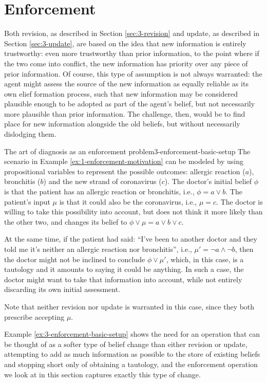 \section{Enforcement}\label{sec:3-enforcement}
Both revision, as described in Section \ref{sec:3-revision}
and update, as described in Section \ref{sec:3-update},
are based on the idea that new information is entirely
trustworthy: even more trustworthy than prior information,
to the point where if the two come into conflict, 
the new information has priority over any piece of prior information.
Of course, this type of assumption is not always warranted:
the agent might assess the source of the new information 
as equally reliable as its own elief formation process,
such that new information may be considered plausible enough 
to be adopted as part of the agent's belief,
but not necessarily more plausible than prior information.
The challenge, then, would be to find place for new information 
alongside the old beliefs, but without necessarily dislodging them.

\begin{xmpl}{The art of diagnosis as an enforcement problem}{3-enforcement-basic-setup}
	The scenario in Example \ref{ex:1-enforcement-motivation} can be modeled by 
	using propositional variables to represent the possible outcomes:
	allergic reaction ($a$), bronchitis ($b$) and the new strand of coronavirus ($c$).
	The doctor's initial belief $\phi$ is that the patient has an allergic reaction or bronchitis,
	i.e., $\phi = a \lor b$.
	The patient's input $\mu$ is that it could also be the coronavirus,
	i.e., $\mu=c$.
	The doctor is willing to take this possibility into account, but does not think it more likely
	than the other two, and changes its belief to $\phi\lor\mu=a \lor b\lor c$.

	At the same time, if the patient had said: 
	``I've been to another doctor and they told me it's neither an allergic reaction nor bronchitis'',
	i.e., $\mu'=\lnot a\land \lnot b$, then the doctor might not be inclined to conclude $\phi\lor\mu'$,
	which, in this case, is a tautology and it amounts to saying it could be anything.
	In such a case, the doctor might want to take that information into account, 
	while not entirely discarding its own initial assessment.

	Note that neither revision nor update is warranted in this case, since they both prescribe accepting $\mu$.
\end{xmpl}

Example \ref{ex:3-enforcement-basic-setup} shows the need 
for an operation that can be thought of as 
a softer type of belief change than either
revision or update, attempting to add as much information 
as possible to the store of existing beliefs 
and stopping short only of obtaining a tautology,
and the enforcement operation we look at in this section 
captures exactly this type of change.

